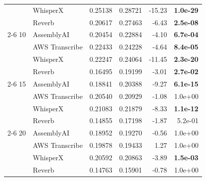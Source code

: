 \begin{tabular}{llrrrr}
  & WhisperX & 0.25138 & 0.28721 & -15.23 & \textbf{ 1.0e-29} \\
  & Reverb & 0.20617 & 0.27463 & -6.43 & \textbf{ 2.5e-08} \\
\cmidrule(r){2-6}
10 & AssemblyAI & 0.20454 & 0.22884 & -4.10 & \textbf{ 6.7e-04} \\
  & AWS Transcribe & 0.22433 & 0.24228 & -4.64 & \textbf{ 8.4e-05} \\
  & WhisperX & 0.22247 & 0.24064 & -11.45 & \textbf{ 2.3e-20} \\
  & Reverb & 0.16495 & 0.19199 & -3.01 & \textbf{ 2.7e-02} \\
\cmidrule(r){2-6}
15 & AssemblyAI & 0.18841 & 0.20388 & -9.27 & \textbf{ 6.1e-15} \\
  & AWS Transcribe & 0.20540 & 0.20929 & -1.08 &  1.0e+00 \\
  & WhisperX & 0.21083 & 0.21879 & -8.33 & \textbf{ 1.1e-12} \\
  & Reverb & 0.14855 & 0.17198 & -1.87 &  5.2e-01 \\
\cmidrule(r){2-6}
20 & AssemblyAI & 0.18952 & 0.19270 & -0.56 &  1.0e+00 \\
  & AWS Transcribe & 0.19878 & 0.19433 & 1.27 &  1.0e+00 \\
  & WhisperX & 0.20592 & 0.20863 & -3.89 & \textbf{ 1.5e-03} \\
  & Reverb & 0.14763 & 0.15901 & -0.78 &  1.0e+00 \\
\bottomrule
\end{tabular}
